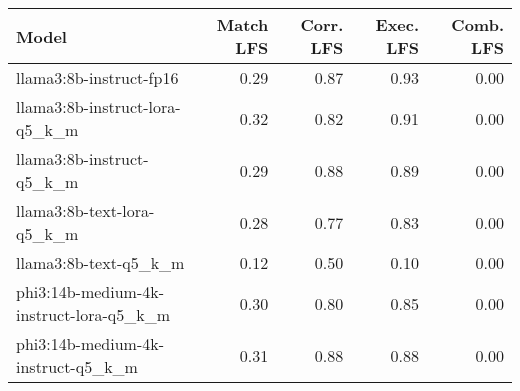 \begin{tabular}{lrrrr}
\toprule
Model & Match LFS & Corr. LFS & Exec. LFS & Comb. LFS \\
\midrule
llama3:8b-instruct-fp16 & 0.29 & 0.87 & 0.93 & 0.00 \\
llama3:8b-instruct-lora-q5\_k\_m & 0.32 & 0.82 & 0.91 & 0.00 \\
llama3:8b-instruct-q5\_k\_m & 0.29 & 0.88 & 0.89 & 0.00 \\
llama3:8b-text-lora-q5\_k\_m & 0.28 & 0.77 & 0.83 & 0.00 \\
llama3:8b-text-q5\_k\_m & 0.12 & 0.50 & 0.10 & 0.00 \\
phi3:14b-medium-4k-instruct-lora-q5\_k\_m & 0.30 & 0.80 & 0.85 & 0.00 \\
phi3:14b-medium-4k-instruct-q5\_k\_m & 0.31 & 0.88 & 0.88 & 0.00 \\
\bottomrule
\end{tabular}
